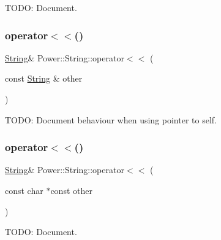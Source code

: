 T\+O\+DO\+: Document. 

\mbox{\label{class_power_1_1_string_a0e79c36bc1ac080cdc9bbe491cea5b32}} 
\subsubsection{\texorpdfstring{operator$<$$<$()}{operator<<()}\hspace{0.1cm}{\footnotesize\ttfamily [1/3]}}
{\footnotesize\ttfamily \hyperlink{class_power_1_1_string}{String}\& Power\+::\+String\+::operator$<$$<$ (\begin{DoxyParamCaption}\item[{const \hyperlink{class_power_1_1_string}{String} \&}]{other }\end{DoxyParamCaption})\hspace{0.3cm}{\ttfamily [inline]}}



T\+O\+DO\+: Document behaviour when using pointer to self. 

\mbox{\label{class_power_1_1_string_a736113857946d87afa440b5f7c758087}} 
\subsubsection{\texorpdfstring{operator$<$$<$()}{operator<<()}\hspace{0.1cm}{\footnotesize\ttfamily [2/3]}}
{\footnotesize\ttfamily \hyperlink{class_power_1_1_string}{String}\& Power\+::\+String\+::operator$<$$<$ (\begin{DoxyParamCaption}\item[{const char $\ast$const}]{other }\end{DoxyParamCaption})\hspace{0.3cm}{\ttfamily [inline]}}



T\+O\+DO\+: Document. 

\mbox{\label{class_power_1_1_string_af89ae1a7a705b6667290a08b911e3971}} 
